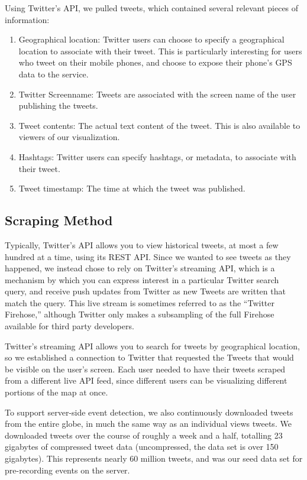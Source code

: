 \documentclass[pdftex,12pt,a4paper]{article}
\begin{document}
Using Twitter's API, we pulled tweets, which contained several relevant pieces of information:
\begin{enumerate}
\item Geographical location: Twitter users can choose to specify a geographical location to associate with their tweet. This is particularly interesting for users who tweet on their mobile phones, and choose to expose their phone's GPS data to the service.
\item Twitter Screenname: Tweets are associated with the screen name of the user publishing the tweets.
\item Tweet contents: The actual text content of the tweet. This is also available to viewers of our visualization.
\item Hashtags: Twitter users can specify hashtags, or metadata, to associate with their tweet. 
\item Tweet timestamp: The time at which the tweet was published.
\end{enumerate}

\subsection{Scraping Method}

Typically, Twitter's API allows you to view historical tweets, at most a few
hundred at a time, using its REST API. Since we wanted to see tweets as they
happened, we instead chose to rely on Twitter's streaming API, which is a
mechanism by which you can express interest in a particular Twitter search
query, and receive push updates from Twitter as new Tweets are written that
match the query. This live stream is sometimes referred to as the ``Twitter
Firehose,'' although Twitter only makes a subsampling of the full Firehose
available for third party developers.

Twitter's streaming API allows you to search for tweets by geographical
location, so we established a connection to Twitter that requested the Tweets
that would be visible on the user's screen. Each user needed to have their
tweets scraped from a different live API feed, since different users can be
visualizing different portions of the map at once.

To support server-side event detection, we also continuously downloaded tweets
from the entire globe, in much the same way as an individual views tweets. We
downloaded tweets over the course of roughly a week and a half, totalling 23
gigabytes of compressed tweet data (uncompressed, the data set is over 150
gigabytes). This represents nearly 60 million tweets, and was our seed data set
for pre-recording events on the server.
\end{document}

